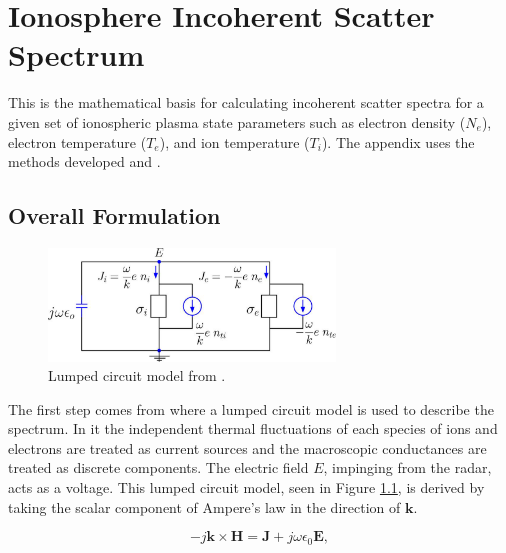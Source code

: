 \chapter{Ionosphere Incoherent Scatter Spectrum}
\label{appendix1}
\thispagestyle{myheadings}
\graphicspath{{Appendix/Figures/}}


This is the mathematical basis for calculating incoherent scatter spectra for a given set of ionospheric plasma state parameters such as electron density ($N_e$), electron temperature ($T_e$),  and ion temperature ($T_i$). The appendix uses the methods developed \citet{kudeki:milla:1} and \citet{Kudeki:2006kx}.

\section{Overall Formulation}

\begin{figure}[htb]
\centering
\includegraphics[width=3.0in]{circuit}
\caption{Lumped circuit model from  \citep{kudeki:milla:1}.}
\label{fig:circuit}
\end{figure}

The first step comes from \citep{kudeki:milla:1} where a lumped circuit model is used to describe the spectrum. In it the independent thermal fluctuations of each species of ions and electrons are treated as current sources and the macroscopic conductances are treated as discrete components. The electric field $E$, impinging from the radar, acts as a voltage. This lumped circuit model, seen in Figure \ref{fig:circuit}, is derived by taking the scalar component of Ampere's law in the direction of $\mathbf{k}$.  

\begin{equation}
\label{eq:ampere}
-j\mathbf{k} \times \mathbf{H} = \mathbf{J} +j\omega \epsilon_0 \mathbf{E},
\end{equation}

